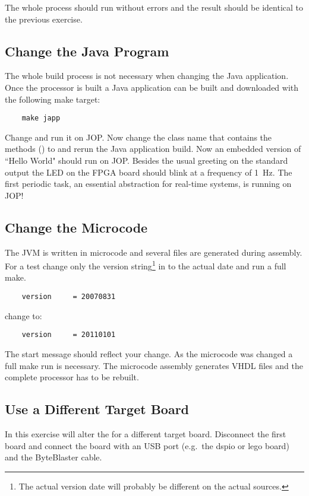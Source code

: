 The whole process should run without errors and the result should be
identical to the previous exercise.

\subsection{Change the Java Program}

The whole build process is not necessary when changing the Java
application. Once the processor is built a Java application can be
built and downloaded with the following make target:
\begin{verbatim}
    make japp
\end{verbatim}
Change  and run it on JOP. Now change the
class name that contains the  methods
() to  and rerun the Java
application build. Now an embedded version of ``Hello World" should
run on JOP. Besides the usual greeting on the standard output the
LED on the FPGA board should blink at a frequency of 1~Hz. The first
periodic task, an essential abstraction for real-time systems, is
running on JOP!

\subsection{Change the Microcode}

The JVM is written in microcode and several  files are
generated during assembly. For a test change only the version
string\footnote{The actual version date will probably be different
on the actual sources.} in  to the actual date and run
a full make.
\begin{verbatim}
    version     = 20070831
\end{verbatim}
    change to:
\begin{verbatim}
    version     = 20110101
\end{verbatim}
The start message should reflect your change. As the microcode was
changed a full make run is necessary. The microcode assembly
generates VHDL files and the complete processor has to be rebuilt.


\subsection{Use a Different Target Board}

In this exercise will alter the  for a different
target board. Disconnect the first board and connect the board with
an USB port (e.g.\ the dspio or lego board) and the ByteBlaster
cable.

